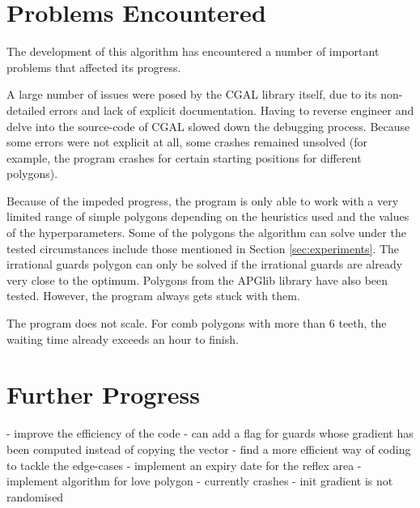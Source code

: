 \section{Problems Encountered}
The development of this algorithm has encountered a number of important problems that affected its progress.

A large number of issues were posed by the CGAL library itself, due to its non-detailed errors and lack of explicit documentation. Having to reverse engineer and delve into the source-code of CGAL slowed down the debugging process. Because some errors were not explicit at all, some crashes remained unsolved (for example, the program crashes for certain starting positions for different polygons).

Because of the impeded progress, the program is only able to work with a very limited range of simple polygons depending on the heuristics used and the values of the hyperparameters. Some of the polygons the algorithm can solve under the tested circumstances include those mentioned in Section \ref{sec:experiments}. The irrational guards polygon can only be solved if the irrational guards are already very close to the optimum. Polygons from the APGlib library \cite{art-gallery-instances-page} have also been tested. However, the program always gets stuck with them.

The program does not scale. For comb polygons with more than 6 teeth, the waiting time already exceeds an hour to finish.


\section{Further Progress}
- improve the efficiency of the code
    - can add a flag for guards whose gradient has been computed instead of copying the vector
- find a more efficient way of coding to tackle the edge-cases
- implement an expiry date for the reflex area
- implement algorithm for love polygon - currently crashes 
- init gradient is not randomised